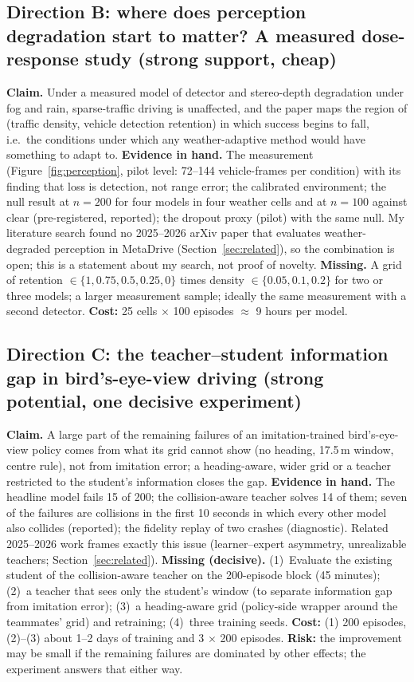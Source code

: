 \subsection{Direction B: where does perception degradation start to matter? A measured dose-response study (strong support, cheap)}
\textbf{Claim.} Under a measured model of detector and stereo-depth degradation under fog and rain, sparse-traffic driving is unaffected, and the paper maps the region of (traffic density, vehicle detection retention) in which success begins to fall, i.e.\ the conditions under which any weather-adaptive method would have something to adapt to.
\textbf{Evidence in hand.} The measurement (Figure~\ref{fig:perception}, pilot level: 72--144 vehicle-frames per condition) with its finding that loss is detection, not range error; the calibrated environment; the null result at $n=200$ for four models in four weather cells and at $n=100$ against clear (pre-registered, reported); the dropout proxy (pilot) with the same null.
My literature search found no 2025--2026 arXiv paper that evaluates weather-degraded perception in MetaDrive (Section~\ref{sec:related}), so the combination is open; this is a statement about my search, not proof of novelty.
\textbf{Missing.} A grid of retention $\in\{1,0.75,0.5,0.25,0\}$ times density $\in\{0.05,0.1,0.2\}$ for two or three models; a larger measurement sample; ideally the same measurement with a second detector. \textbf{Cost:} 25 cells $\times$ 100 episodes $\approx$ 9 hours per model.

\subsection{Direction C: the teacher--student information gap in bird's-eye-view driving (strong potential, one decisive experiment)}
\textbf{Claim.} A large part of the remaining failures of an imitation-trained bird's-eye-view policy comes from what its grid cannot show (no heading, 17.5\,m window, centre rule), not from imitation error; a heading-aware, wider grid or a teacher restricted to the student's information closes the gap.
\textbf{Evidence in hand.} The headline model fails 15 of 200; the collision-aware teacher solves 14 of them; seven of the failures are collisions in the first 10 seconds in which every other model also collides (reported); the fidelity replay of two crashes (diagnostic).
Related 2025--2026 work frames exactly this issue (learner--expert asymmetry, unrealizable teachers; Section~\ref{sec:related}).
\textbf{Missing (decisive).} (1)~Evaluate the existing student of the collision-aware teacher on the 200-episode block (45 minutes); (2)~a teacher that sees only the student's window (to separate information gap from imitation error); (3)~a heading-aware grid (policy-side wrapper around the teammates' grid) and retraining; (4)~three training seeds. \textbf{Cost:} (1) 200 episodes, (2)--(3) about 1--2 days of training and 3 $\times$ 200 episodes.
\textbf{Risk:} the improvement may be small if the remaining failures are dominated by other effects; the experiment answers that either way.

